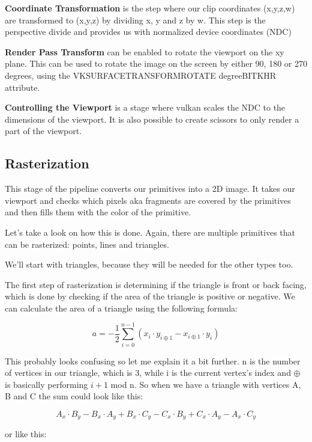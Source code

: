 \documentclass[12pt]{report} \usepackage{preamble}
\begin{document}
\textbf{Coordinate Transformation} is the step where our clip coordinates (x,y,z,w)
are transformed to (x,y,z) by dividing x, y and z by w.
This step is the perspective divide and provides us with
normalized device coordinates (NDC) \cite{vertex-post-processing}

\textbf{Render Pass Transform} can be enabled to rotate the viewport on the xy plane.
This can be used to rotate the image on the screen by either 90, 180 or 270 degrees, using the
VK\textunderscore SURFACE\textunderscore TRANSFORM\textunderscore ROTATE\textunderscore
{degree}\textunderscore BIT\textunderscore KHR attribute. \cite{vertex-post-processing}

\textbf{Controlling the Viewport} is a stage where vulkan scales the NDC
to the dimensions of the viewport. It is also possible to create
scissors to only render a part of the viewport.

\subsection{Rasterization}

This stage of the pipeline converts our primitives into a 2D image.
It takes our viewport and checks which pixels aka fragments are covered by the
primitives and then fills them with the color of the primitive.

Let's take a look on how this is done. Again, there are multiple primitives that can be rasterized:
points, lines and triangles.

We'll start with triangles, because they will be needed for the other types too.

The first step of rasterization is determining if the triangle is front or back facing,
which is done by checking if the area of the triangle is positive or negative.
We can calculate the area of a triangle using the following formula:

\[
	a = -\frac{1}{2} \sum_{i=0}^{n-1} (x_i \cdot y_{i\oplus 1} - x_{i\oplus 1} \cdot y_i)
\]

This probably looks confusing so let me explain it a bit further.
n is the number of vertices in our triangle, which is 3, while i is the current
vertex's index and \(\oplus\) is basically performing \( i+1\) mod n.
So when we have a triangle with vertices A, B and C the sum could look like this:

\[A_x \cdot B_y - B_x \cdot A_y + B_x \cdot C_y - C_x \cdot B_y + C_x \cdot A_y - A_x \cdot C_y\]

or like this:
\end{document}
